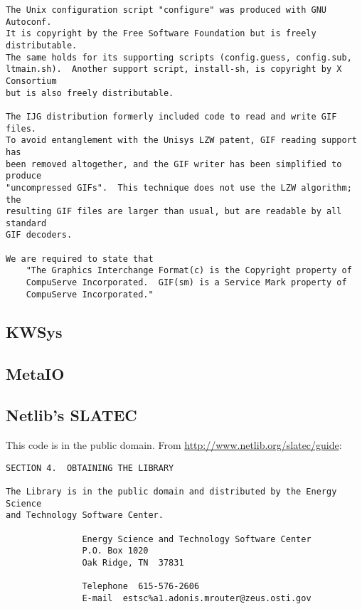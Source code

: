 \begin{verbatim}
The Unix configuration script "configure" was produced with GNU Autoconf.
It is copyright by the Free Software Foundation but is freely distributable.
The same holds for its supporting scripts (config.guess, config.sub,
ltmain.sh).  Another support script, install-sh, is copyright by X Consortium
but is also freely distributable.

The IJG distribution formerly included code to read and write GIF files.
To avoid entanglement with the Unisys LZW patent, GIF reading support has
been removed altogether, and the GIF writer has been simplified to produce
"uncompressed GIFs".  This technique does not use the LZW algorithm; the
resulting GIF files are larger than usual, but are readable by all standard
GIF decoders.

We are required to state that
    "The Graphics Interchange Format(c) is the Copyright property of
    CompuServe Incorporated.  GIF(sm) is a Service Mark property of
    CompuServe Incorporated."
\end{verbatim}

\subsection{KWSys}


\subsection{MetaIO}


\subsection{Netlib's SLATEC}
This code is in the public domain.  From
\url{http://www.netlib.org/slatec/guide}:
\begin{verbatim}
SECTION 4.  OBTAINING THE LIBRARY

The Library is in the public domain and distributed by the Energy Science
and Technology Software Center.

               Energy Science and Technology Software Center
               P.O. Box 1020
               Oak Ridge, TN  37831

               Telephone  615-576-2606
               E-mail  estsc%a1.adonis.mrouter@zeus.osti.gov
\end{verbatim}

